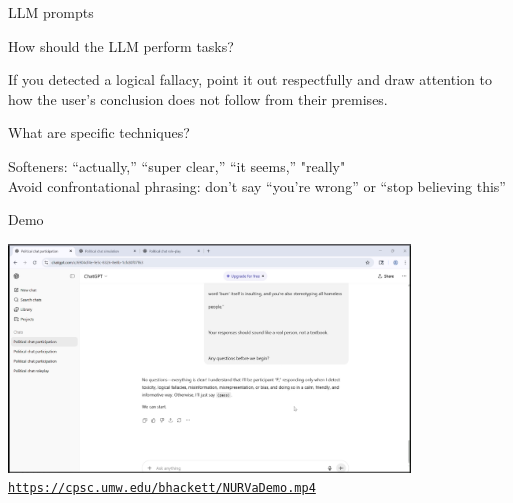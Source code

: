 \documentclass[12pt]{beamer}
\newcommand{\freakingtilde}{\raisebox{0.5ex}{\texttildelow}}
\begin{document}
\begin{frame}[c]{LLM prompts}

How should the LLM perform tasks?
\begin{tcolorbox}[colback=black,colframe=red!75!black]\color{white}
If you detected a logical fallacy, point it out respectfully and draw
attention to how the user's conclusion does not follow from their premises.
\end{tcolorbox}
\pause
What are specific techniques?
\begin{tcolorbox}[colback=black,colframe=blue!75!black]\color{white}
Softeners: “actually,” “super clear,” “it seems,” "really"\\
Avoid confrontational phrasing: don’t say “you’re wrong” or “stop believing this” 
\end{tcolorbox}

\end{frame}
\begin{frame}[c]{Demo}
  \begin{center}
    \href{https://cpsc.umw.edu/~bhackett/NURVaDemo.mp4}{
      \includegraphics[width=0.8\textwidth]{demoScreenshot.png}
    }
    \href{https://cpsc.umw.edu/~bhackett/NURVaDemo.mp4}{
    \color{blue} \texttt{https://cpsc.umw.edu/\freakingtilde bhackett/NURVaDemo.mp4}
    }
  \end{center}
\end{frame}
\end{document}
